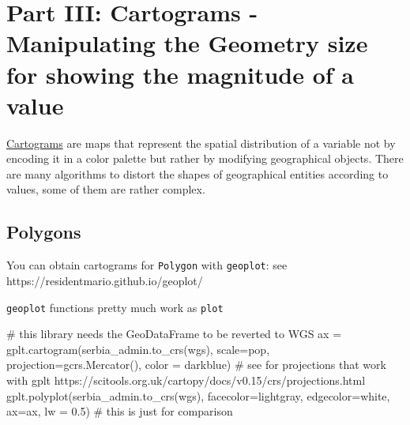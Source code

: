 \documentclass[
  letterpaper,
  DIV=11,
  numbers=noendperiod]{scrreprt}
\newenvironment{Shaded}{\begin{snugshade}}{\end{snugshade}}
\newcommand{\CommentTok}[1]{\textcolor[rgb]{0.37,0.37,0.37}{#1}}
\newcommand{\FloatTok}[1]{\textcolor[rgb]{0.68,0.00,0.00}{#1}}
\newcommand{\NormalTok}[1]{\textcolor[rgb]{0.00,0.23,0.31}{#1}}
\newcommand{\OperatorTok}[1]{\textcolor[rgb]{0.37,0.37,0.37}{#1}}
\newcommand{\StringTok}[1]{\textcolor[rgb]{0.13,0.47,0.30}{#1}}
\begin{document}
\section{Part III: Cartograms - Manipulating the Geometry size for
showing the magnitude of a
value}\label{part-iii-cartograms---manipulating-the-geometry-size-for-showing-the-magnitude-of-a-value}

\href{https://www.data-to-viz.com/graph/cartogram.html}{Cartograms} are
maps that represent the spatial distribution of a variable not by
encoding it in a color palette but rather by modifying geographical
objects. There are many algorithms to distort the shapes of geographical
entities according to values, some of them are rather complex.

\subsection{Polygons}\label{polygons}

You can obtain cartograms for \texttt{Polygon} with \texttt{geoplot}:
see https://residentmario.github.io/geoplot/

\texttt{geoplot} functions pretty much work as \texttt{plot}

\begin{Shaded}
\begin{Highlighting}[]
\CommentTok{\# this library needs the GeoDataFrame to be reverted to WGS}
\NormalTok{ax }\OperatorTok{=}\NormalTok{ gplt.cartogram(serbia\_admin.to\_crs(wgs), scale}\OperatorTok{=}\StringTok{\textquotesingle{}pop\textquotesingle{}}\NormalTok{, projection}\OperatorTok{=}\NormalTok{gcrs.Mercator(), color }\OperatorTok{=} \StringTok{\textquotesingle{}darkblue\textquotesingle{}}\NormalTok{)}
\CommentTok{\# see for projections that work with gplt https://scitools.org.uk/cartopy/docs/v0.15/crs/projections.html}
\NormalTok{gplt.polyplot(serbia\_admin.to\_crs(wgs), facecolor}\OperatorTok{=}\StringTok{\textquotesingle{}lightgray\textquotesingle{}}\NormalTok{, edgecolor}\OperatorTok{=}\StringTok{\textquotesingle{}white\textquotesingle{}}\NormalTok{, ax}\OperatorTok{=}\NormalTok{ax, lw }\OperatorTok{=} \FloatTok{0.5}\NormalTok{) }\CommentTok{\# this is just for comparison}
\end{Highlighting}
\end{Shaded}
\end{document}
